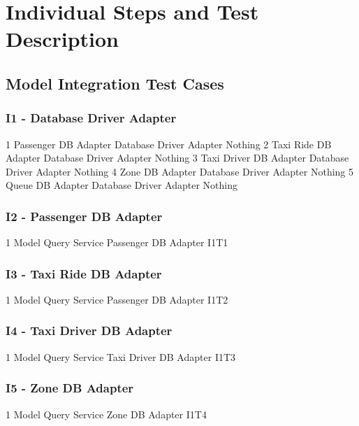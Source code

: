 \section{Individual Steps and Test Description}

\subsection{Model Integration Test Cases}
\subsubsection{I1 - Database Driver Adapter}
\testCaseSimpleSimple
	{1}
	{Passenger DB Adapter}
	{Database Driver Adapter}
	{Nothing}
\testCaseSimpleSimple
	{2}
	{Taxi Ride DB Adapter}
	{Database Driver Adapter}
	{Nothing}
\testCaseSimpleSimple
	{3}
	{Taxi Driver DB Adapter}
	{Database Driver Adapter}
	{Nothing}
\testCaseSimpleSimple
	{4}
	{Zone DB Adapter}
	{Database Driver Adapter}
	{Nothing}
\testCaseSimpleSimple
	{5}
	{Queue DB Adapter}
	{Database Driver Adapter}
	{Nothing}
\subsubsection{I2 - Passenger DB Adapter}
\testCaseSimpleSimple
	{1}
	{Model Query Service}
	{Passenger DB Adapter}
	{I1T1}
\subsubsection{I3 - Taxi Ride DB Adapter}
\testCaseSimpleSimple
	{1}
	{Model Query Service}
	{Passenger DB Adapter}
	{I1T2}
\subsubsection{I4 - Taxi Driver DB Adapter}
\testCaseSimpleSimple
	{1}
	{Model Query Service}
	{Taxi Driver DB Adapter}
	{I1T3}
\subsubsection{I5 - Zone DB Adapter}
\testCaseSimpleSimple
	{1}
	{Model Query Service}
	{Zone DB Adapter}
	{I1T4}
